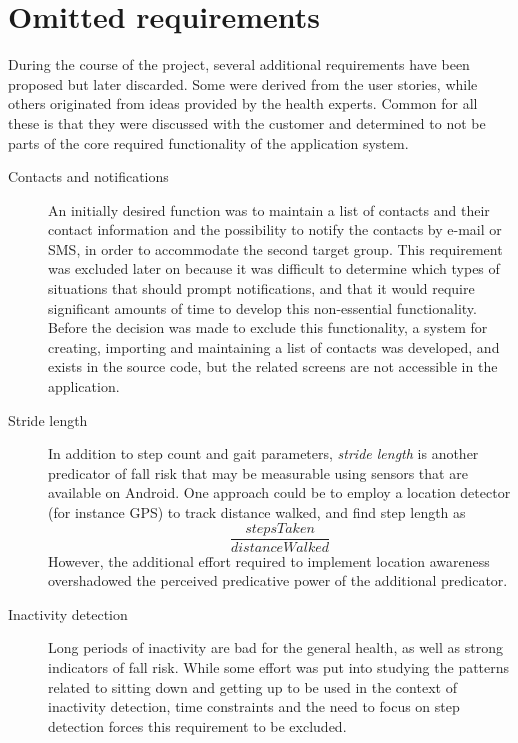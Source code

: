 \section{Omitted requirements} \label{expert_meeting_requirement}
During the course of the project, several additional requirements have been proposed but later discarded. Some were derived from the user stories, while others originated from ideas provided by the health experts. Common for all these is that they were discussed with the customer and determined to not be parts of the core required functionality of the application system.

\begin{description} 
\item[Contacts and notifications] An initially desired function was to maintain a list of contacts and their contact information and the possibility to notify the contacts by e-mail or SMS, in order to accommodate the second target group. This requirement was excluded later on because it was difficult to determine which types of situations that should prompt notifications, and that it would require significant amounts of time to develop this non-essential functionality. Before the decision was made to exclude this functionality, a system for creating, importing and maintaining a list of contacts was developed, and exists in the source code, but the related screens are not accessible in the application.
\item[Stride length] In addition to step count and gait parameters, \emph{stride length} is another predicator of fall risk that may be measurable using sensors that are available on Android. One approach could be to employ a location detector (for instance GPS) to track distance walked, and find step length as $$\frac{stepsTaken}{distanceWalked}$$However, the additional effort required to implement location awareness overshadowed the perceived predicative power of the additional predicator.
\item[Inactivity detection] Long periods of inactivity are bad for the general health, as well as strong indicators of fall risk. While some effort was put into studying the patterns related to sitting down and getting up to be used in the context of inactivity detection, time constraints and the need to focus on step detection forces this requirement to be excluded. 
\end{description} 


